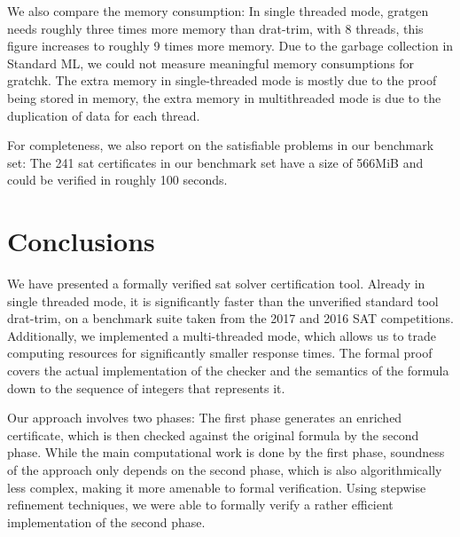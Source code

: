\documentclass[smallcondensed]{svjour3}     %
\begin{document}
  We also compare the memory consumption: In single threaded mode, gratgen needs roughly three times more memory than drat-trim, with 8 threads, this figure increases to 
  roughly 9 times more memory. Due to the garbage collection in Standard ML, we could not measure meaningful memory consumptions for gratchk.
  The extra memory in single-threaded mode is mostly due to the proof being stored in memory, the extra memory in multithreaded mode is due to the duplication of data for each thread.
  
  For completeness, we also report on the satisfiable problems in our benchmark set: The 241 sat certificates in our benchmark set have a size of 566MiB and could be
  verified in roughly 100 seconds.

  
  
  

\section{Conclusions}\label{sec:concl}


We have presented a formally verified sat solver certification tool. 
Already in single threaded mode, it is significantly faster than the unverified standard tool drat-trim, on a benchmark 
suite taken from the 2017 and 2016 SAT competitions.
Additionally, we implemented a multi-threaded mode, 
which allows us to trade computing resources for significantly smaller response times.
The formal proof covers the actual implementation of the checker and the semantics of the 
formula down to the sequence of integers that represents it.

Our approach involves two phases: The first phase generates an enriched certificate, 
which is then checked against the original formula by the second phase.
While the main computational work is done by the first phase, soundness of the approach 
only depends on the second phase, which is also algorithmically less complex, making it more amenable to formal verification. 
Using stepwise refinement techniques, we were able to formally verify a rather efficient implementation of the second phase.
\end{document}
